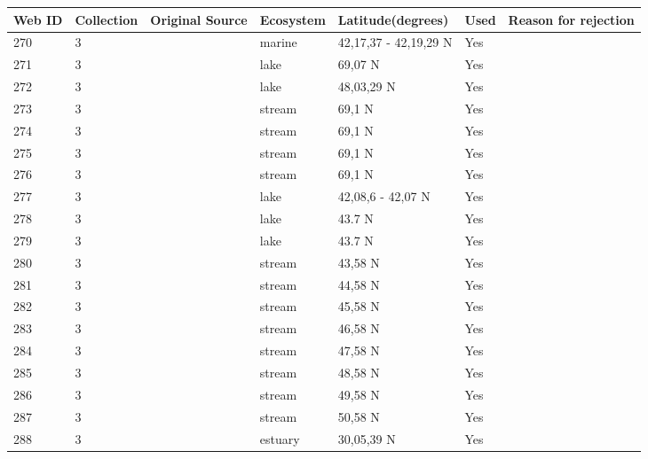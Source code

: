 \documentclass[12pt]{article}
\begin{document}
\begin{landscape}
    \begin{table}[h!]
    \centering
    {\footnotesize
      \begin{tabular}{p{2.8cm}p{1.3cm}p{5.5cm}p{2.2cm}p{2.5cm}lp{3.5cm}}
        \hline
        Web ID & Collection & Original Source & Ecosystem & Latitude(degrees) & Used  & Reason for rejection  \\
        \hline
        270   & 3 & \cite{Filgueira2011}  & marine & 42,17,37 - 42,19,29 N & Yes   &       \\
        271   & 3 & \cite{Amundsen2013}  & lake  & 69,07 N & Yes   &        \\
        272   & 3 & \cite{Hampton2011}    & lake  & 48,03,29 N & Yes   &       \\
        273   & 3 & \cite{Parker2006}  & stream & 69,1 N & Yes   &       \\
        274   & 3 & \cite{Parker2006}  & stream & 69,1 N & Yes   &       \\
        275   & 3 & \cite{Parker2006}  & stream & 69,1 N & Yes   &       \\
        276   & 3 & \cite{Parker2006}  & stream & 69,1 N & Yes   &       \\
        277   & 3 & \cite{Massana1996}  & lake  & 42,08,6 - 42,07 N & Yes   &       \\
        278   & 3 & \cite{Stewart2011}    & lake  & 43.7 N & Yes   &       \\
        279   & 3 & \cite{Stewart2011}    & lake  & 43.7 N & Yes   &       \\
        280   & 3 & \cite{Cromar1996}  & stream & 43,58 N & Yes   &       \\
        281   & 3 & \cite{Cromar1996}  & stream & 44,58 N & Yes   &       \\
        282   & 3 & \cite{Cromar1996}  & stream & 45,58 N & Yes   &       \\
        283   & 3 & \cite{Cromar1996}  & stream & 46,58 N & Yes   &       \\
        284   & 3 & \cite{Cromar1996}  & stream & 47,58 N & Yes   &       \\
        285   & 3 & \cite{Cromar1996}  & stream & 48,58 N & Yes   &       \\
        286   & 3 & \cite{Cromar1996}  & stream & 49,58 N & Yes   &       \\
        287   & 3 & \cite{Cromar1996}  & stream & 50,58 N & Yes   &       \\
        288   & 3 & \cite{Christian1999}    & estuary & 30,05,39 N & Yes   &       \\

\end{tabular}}
\end{table}
\end{landscape}
\end{document}

